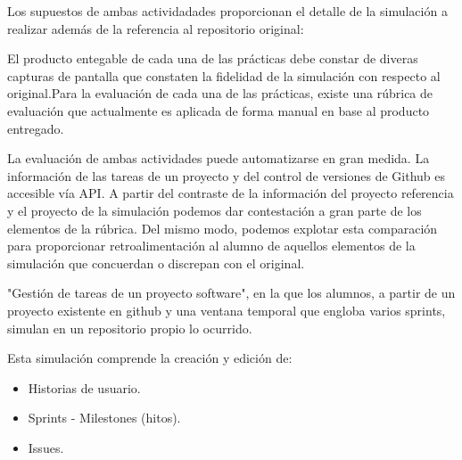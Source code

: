 Los supuestos de ambas actividadades proporcionan el  detalle de la simulación a realizar además de la referencia al repositorio original:



El producto entegable de cada una de las prácticas debe constar de diveras capturas de pantalla que constaten la fidelidad de la simulación con respecto al original.Para la evaluación de cada una de las prácticas, existe una rúbrica de evaluación que actualmente es aplicada de forma manual en base al producto entregado.

La evaluación de ambas actividades puede automatizarse en gran medida. La información de las tareas de un proyecto y del control de versiones de Github es accesible vía API. A partir del contraste de la información del proyecto referencia y el proyecto de la simulación podemos dar contestación a gran parte de los elementos de la rúbrica. Del mismo modo, podemos explotar esta comparación para proporcionar retroalimentación al alumno de aquellos elementos de la simulación que concuerdan o discrepan con el original.

"Gestión de tareas de un proyecto software", en la que los alumnos, a partir de un proyecto existente en github y una ventana temporal que engloba varios sprints, simulan en un repositorio propio lo ocurrido.

Esta simulación comprende la creación y edición de:

\begin{itemize}
	\item Historias de usuario.
	\item Sprints - Milestones (hitos).
	\item Issues.
\end{itemize}



 